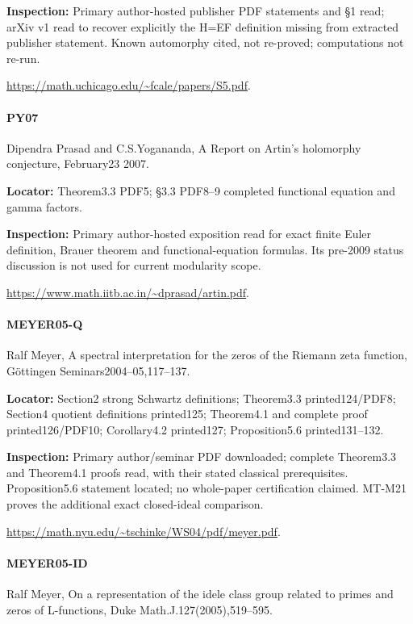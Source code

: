 \documentclass[11pt,a4paper]{article}
\begin{document}
\textbf{Inspection:} Primary author-hosted publisher PDF statements and §1 read; arXiv v1 read to recover explicitly the H=EF definition missing from extracted publisher statement.\allowbreak{} Known automorphy cited, not re-proved; computations not re-run.\allowbreak{}

\url{https://math.uchicago.edu/~fcale/papers/S5.pdf}.

\paragraph{PY07} Dipendra Prasad and C.\allowbreak{}S.\allowbreak{}Yogananda, A Report on Artin’s holomorphy conjecture, February23 2007.

\textbf{Locator:} Theorem3.\allowbreak{}3 PDF5; §3.\allowbreak{}3 PDF8–\allowbreak{}9 completed functional equation and gamma factors.

\textbf{Inspection:} Primary author-hosted exposition read for exact finite Euler definition, Brauer theorem and functional-equation formulas.\allowbreak{} Its pre-2009 status discussion is not used for current modularity scope.\allowbreak{}

\url{https://www.math.iitb.ac.in/~dprasad/artin.pdf}.

\paragraph{MEYER05-Q} Ralf Meyer, A spectral interpretation for the zeros of the Riemann zeta function, Göttingen Seminars2004–\allowbreak{}05,117–\allowbreak{}137.

\textbf{Locator:} Section2 strong Schwartz definitions; Theorem3.\allowbreak{}3 printed124/\allowbreak{}PDF8; Section4 quotient definitions printed125; Theorem4.\allowbreak{}1 and complete proof printed126/\allowbreak{}PDF10; Corollary4.\allowbreak{}2 printed127; Proposition5.\allowbreak{}6 printed131–\allowbreak{}132.

\textbf{Inspection:} Primary author/\allowbreak{}seminar PDF downloaded; complete Theorem3.\allowbreak{}3 and Theorem4.\allowbreak{}1 proofs read, with their stated classical prerequisites.\allowbreak{} Proposition5.\allowbreak{}6 statement located; no whole-paper certification claimed.\allowbreak{} MT-M21 proves the additional exact closed-ideal comparison.\allowbreak{}

\url{https://math.nyu.edu/~tschinke/WS04/pdf/meyer.pdf}.

\paragraph{MEYER05-ID} Ralf Meyer, On a representation of the idele class group related to primes and zeros of L-functions, Duke Math.\allowbreak{}J.\allowbreak{}127(2005),519–\allowbreak{}595.
\end{document}
